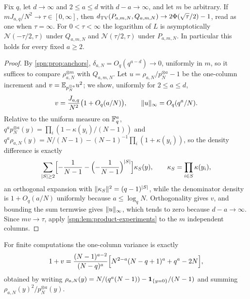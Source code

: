 \begin{theorem}\label{spn:thm:anchors}
Fix $q$, let $d\to\infty$ and $2\le a\le d$ with $d-a\to\infty$, and let $m$ be arbitrary. If
$mJ_{a,q}/N^2\to\tau\in[0,\infty]$, then $d_{\mathrm{TV}}(P_{a,m,N},Q_{a,m,N})\to2\Phi(\sqrt\tau/2)-1$, read as
one when $\tau=\infty$. For $0<\tau<\infty$ the logarithm of $L$ is asymptotically $\mathcal N(-\tau/2,\tau)$
under $Q_{a,m,N}$ and $\mathcal N(\tau/2,\tau)$ under $P_{a,m,N}$. In particular this holds for every
fixed $a\ge2$.
\end{theorem}

\begin{proof}
By \cref{spn:prop:anchors}, $\delta_{a,N}=O_q(q^{a-d})\to0$, uniformly in $m$, so it suffices to compare
$\rho_{a,N}^{\otimes m}$ with $Q_{a,m,N}$. Let $u=\rho_{a,N}/p_N^{\otimes a}-1$ be the one-column increment
and $v=\mathbb{E}_{p_N^{\otimes a}}u^2$; we show, uniformly for $2\le a\le d$,
\[
 v=\frac{J_{a,q}}{N^2}\bigl(1+O_q(a/N)\bigr),\qquad \lVert u\rVert_\infty=O_q(q^a/N).
\]
Relative to the uniform measure on $\mathbb{F}_q^a$, $q^ap_N^{\otimes a}(y)=\prod_i(1-\kappa(y_i)/(N-1))$ and
$q^a\rho_{a,N}(y)=N/(N-1)-(N-1)^{-1}\prod_i(1+\kappa(y_i))$, so the density difference is exactly
\[
 \sum_{\lvert S\rvert\ge2}\Bigl[-\frac1{N-1}-\Bigl(-\frac1{N-1}\Bigr)^{\lvert S\rvert}\Bigr]\kappa_S(y),\qquad
 \kappa_S=\prod_{i\in S}\kappa(y_i),
\]
an orthogonal expansion with $\lVert\kappa_S\rVert^2=(q-1)^{\lvert S\rvert}$, while the denominator density is
$1+O_q(a/N)$ uniformly because $a\le\log_qN$. Orthogonality gives $v$, and bounding the sum termwise
gives $\lVert u\rVert_\infty$, which tends to zero because $d-a\to\infty$. Since $mv\to\tau$, apply
\cref{spn:lem:product-experiments} to the $m$ independent columns.
\end{proof}

For finite computations the one-column variance is exactly
\[
 1+v=\frac{(N-1)^{a-2}}{(N-q)^a}\Bigl[N^{2-a}(N-q+1)^a+q^a-2N\Bigr],
\]
obtained by writing $\rho_{a,N}(y)=N/(q^a(N-1))-\mathbf 1_{\{y=0\}}/(N-1)$ and summing
$\rho_{a,N}(y)^2/p_N^{\otimes a}(y)$.

